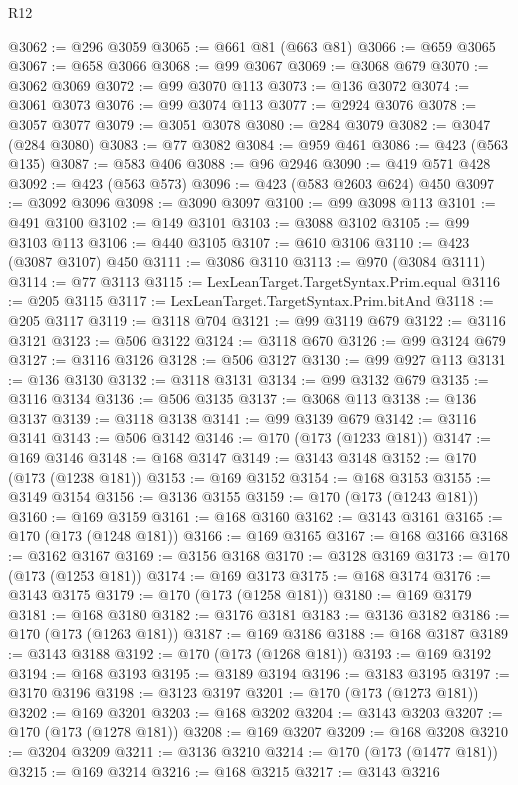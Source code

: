 \begin{lexlean}{R12}
\begin{coremodule}
{{{{{{{{{{{{{{{{{{{{{{{{{{{{{{{{{{{{{{{{{{{{{{{{{{{{{{{{{{{{{{{{{{{{{{{{{{{{{{{{{{{{{{{{{{{{{{{{{{{{{{{{{{@3062 := @296 @3059
@3065 := @661 @81 (@663 @81)
@3066 := @659 @3065
@3067 := @658 @3066
@3068 := @99 @3067
@3069 := @3068 @679
@3070 := @3062 @3069
@3072 := @99 @3070 @113
@3073 := @136 @3072
@3074 := @3061 @3073
@3076 := @99 @3074 @113
@3077 := @2924 @3076
@3078 := @3057 @3077
@3079 := @3051 @3078
@3080 := @284 @3079
@3082 := @3047 (@284 @3080)
@3083 := @77 @3082
@3084 := @959 @461
@3086 := @423 (@563 @135)
@3087 := @583 @406
@3088 := @96 @2946
@3090 := @419 @571 @428
@3092 := @423 (@563 @573)
@3096 := @423 (@583 @2603 @624) @450
@3097 := @3092 @3096
@3098 := @3090 @3097
@3100 := @99 @3098 @113
@3101 := @491 @3100
@3102 := @149 @3101
@3103 := @3088 @3102
@3105 := @99 @3103 @113
@3106 := @440 @3105
@3107 := @610 @3106
@3110 := @423 (@3087 @3107) @450
@3111 := @3086 @3110
@3113 := @970 (@3084 @3111)
@3114 := @77 @3113
@3115 := LexLeanTarget.TargetSyntax.Prim.equal
@3116 := @205 @3115
@3117 := LexLeanTarget.TargetSyntax.Prim.bitAnd
@3118 := @205 @3117
@3119 := @3118 @704
@3121 := @99 @3119 @679
@3122 := @3116 @3121
@3123 := @506 @3122
@3124 := @3118 @670
@3126 := @99 @3124 @679
@3127 := @3116 @3126
@3128 := @506 @3127
@3130 := @99 @927 @113
@3131 := @136 @3130
@3132 := @3118 @3131
@3134 := @99 @3132 @679
@3135 := @3116 @3134
@3136 := @506 @3135
@3137 := @3068 @113
@3138 := @136 @3137
@3139 := @3118 @3138
@3141 := @99 @3139 @679
@3142 := @3116 @3141
@3143 := @506 @3142
@3146 := @170 (@173 (@1233 @181))
@3147 := @169 @3146
@3148 := @168 @3147
@3149 := @3143 @3148
@3152 := @170 (@173 (@1238 @181))
@3153 := @169 @3152
@3154 := @168 @3153
@3155 := @3149 @3154
@3156 := @3136 @3155
@3159 := @170 (@173 (@1243 @181))
@3160 := @169 @3159
@3161 := @168 @3160
@3162 := @3143 @3161
@3165 := @170 (@173 (@1248 @181))
@3166 := @169 @3165
@3167 := @168 @3166
@3168 := @3162 @3167
@3169 := @3156 @3168
@3170 := @3128 @3169
@3173 := @170 (@173 (@1253 @181))
@3174 := @169 @3173
@3175 := @168 @3174
@3176 := @3143 @3175
@3179 := @170 (@173 (@1258 @181))
@3180 := @169 @3179
@3181 := @168 @3180
@3182 := @3176 @3181
@3183 := @3136 @3182
@3186 := @170 (@173 (@1263 @181))
@3187 := @169 @3186
@3188 := @168 @3187
@3189 := @3143 @3188
@3192 := @170 (@173 (@1268 @181))
@3193 := @169 @3192
@3194 := @168 @3193
@3195 := @3189 @3194
@3196 := @3183 @3195
@3197 := @3170 @3196
@3198 := @3123 @3197
@3201 := @170 (@173 (@1273 @181))
@3202 := @169 @3201
@3203 := @168 @3202
@3204 := @3143 @3203
@3207 := @170 (@173 (@1278 @181))
@3208 := @169 @3207
@3209 := @168 @3208
@3210 := @3204 @3209
@3211 := @3136 @3210
@3214 := @170 (@173 (@1477 @181))
@3215 := @169 @3214
@3216 := @168 @3215
@3217 := @3143 @3216
}}}}}}}}}}}}}}}}}}}}}}}}}}}}}}}}}}}}}}}}}}}}}}}}}}}}}}}}}}}}}}}}}}}}}}}}}}}}}}}}}}}}}}}}}}}}}}}}}}}}}}}}}}
\end{coremodule}
\end{lexlean}
